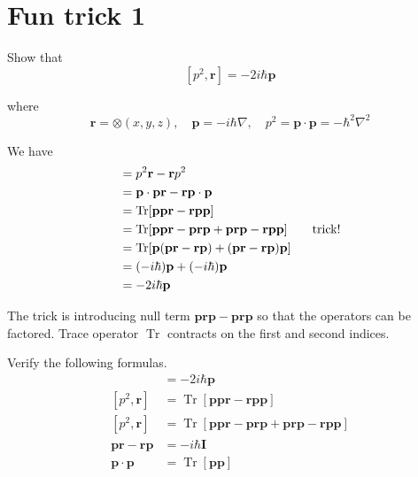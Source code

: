 

\section*{Fun trick 1}

Show that
\begin{equation*}
\left[p^2,\mathbf r\right]=-2i\hbar\mathbf p
\end{equation*}

where
\begin{equation*}
\mathbf r=\otimes(x,y,z),\quad
\mathbf p=-i\hbar\nabla,\quad
p^2=\mathbf p\cdot\mathbf p=-\hbar^2\nabla^2
\end{equation*}

We have
\begin{align*}
[p^2,\mathbf r]
&=p^2\mathbf r-\mathbf rp^2
\\
&=\mathbf p\cdot\mathbf p\mathbf r-\mathbf r \mathbf p\cdot\mathbf p
\\
&=\operatorname{Tr}[\mathbf{ppr}-\mathbf{rpp}]
\\
&=\operatorname{Tr}[\mathbf p\mathbf p\mathbf r-\mathbf p\mathbf r\mathbf p
+\mathbf p\mathbf r\mathbf p-\mathbf r\mathbf p\mathbf p]
\tag*{\text{trick!}}
\\
&=\operatorname{Tr}[\mathbf p(\mathbf{pr}-\mathbf{rp})
+(\mathbf{pr}-\mathbf{rp})\mathbf p]
\\
&=(-i\hbar)\mathbf p+(-i\hbar)\mathbf p
\\
&=-2i\hbar\mathbf p
\end{align*}

The trick is introducing null term $\mathbf{prp}-\mathbf{prp}$
so that the operators can be factored.
Trace operator $\operatorname{Tr}$ contracts on the first and second indices.

\bigskip
Verify the following formulas.
\begin{align*}
[p^2,\mathbf r]
&=-2i\hbar\mathbf p
\tag{1}
\\[1ex]
[p^2,\mathbf r]
&=\operatorname{Tr}[\mathbf{ppr}-\mathbf{rpp}]
\tag{2}
\\[1ex]
[p^2,\mathbf r]
&=\operatorname{Tr}[\mathbf p\mathbf p\mathbf r-\mathbf p\mathbf r\mathbf p
+\mathbf p\mathbf r\mathbf p-\mathbf r\mathbf p\mathbf p]
\tag{3}
\\[1ex]
\mathbf p\mathbf r-\mathbf r\mathbf p&=-i\hbar\mathbf I
\tag{4}
\\[1ex]
\mathbf p\cdot\mathbf p&=\operatorname{Tr}[\mathbf p\mathbf p]
\tag{5}
\end{align*}



